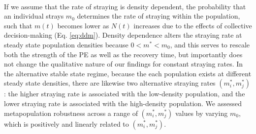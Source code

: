 \documentclass[twocolumn,preprintnumbers,amsmath,amssymb,superscriptaddress]{revtex4}
\begin{document}
\\
\noindent If we assume that the rate of straying is density dependent, the probability that an individual strays $m_0$ determines the rate of straying within the population, such that $m(t)$ becomes lower as $N(t)$ increases due to the effects of collective decision-making \cite{Berdahl:2016dx} (Eq. \ref{eq:ddm}).
Density dependence alters the straying rate at steady state population densities because $0 < m^* < m_0$, and this serves to rescale both the strength of the PE as well as the recovery time, but importantly does not change the qualitative nature of our findings for constant straying rates.
In the alternative stable state regime, because the each population exists at different steady state densities, there are likewise two alternative straying rates $(m_i^*,m_j^*)$: the higher straying rate is associated with the low-density population, and the lower straying rate is associated with the high-density population.
We assessed metapopulation robustness across a range of $(m_i^*,m_j^*)$ values by varying $m_0$, which is positively and linearly related to $(m_i^*,m_j^*)$.
\\


% 
% 
% 
% 
% 
\end{document}
